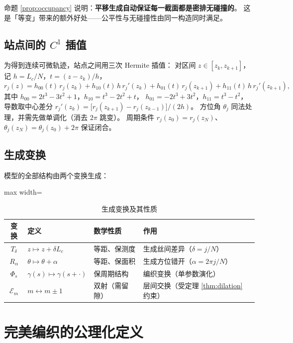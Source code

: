 \documentclass[12pt, a4paper]{ctexart}
\begin{document}
命题 \ref{prop:occupancy} 说明：\textbf{平移生成自动保证每一截面都是密排无碰撞的}。
这是「等变」带来的额外好处——公平性与无碰撞性由同一构造同时满足。

\subsection{站点间的 $C^1$ 插值}
\label{sec:interp}

为得到连续可微轨迹，站点之间用三次 Hermite 插值：
对区间 $z\in[z_k,z_{k+1}]$，记 $h=L_c/N$，$t=(z-z_k)/h$，
\begin{equation}
r_j(z) = h_{00}(t)\,r_j(z_k) + h_{10}(t)\,h\,r_j'(z_k)
       + h_{01}(t)\,r_j(z_{k+1}) + h_{11}(t)\,h\,r_j'(z_{k+1}),
\end{equation}
其中 $h_{00}=2t^3-3t^2+1$，$h_{10}=t^3-2t^2+t$，
$h_{01}=-2t^3+3t^2$，$h_{11}=t^3-t^2$，
导数取中心差分 $r_j'(z_k)=\big[r_j(z_{k+1})-r_j(z_{k-1})\big]/(2h)$。
方位角 $\theta_j$ 同法处理，并需先做单调化（消去 $2\pi$ 跳变）。
周期条件 $r_j(z_0)=r_j(z_N)$、$\theta_j(z_N)=\theta_j(z_0)+2\pi$ 保证闭合。

\subsection{生成变换}

模型的全部结构由两个变换生成：

\begin{table}[htbp]
\centering
\caption{生成变换及其性质}
\label{tab:transforms}
\begin{adjustbox}{max width=\textwidth}
\begin{tabular}{clll}
\toprule
变换 & 定义 & 数学性质 & 作用 \\
\midrule
$T_\delta$ & $z \mapsto z + \delta L_c$ & 等距、保测度 & 生成丝间差异（$\delta=j/N$）\\
$R_\alpha$ & $\theta \mapsto \theta + \alpha$ & 等距、保面积 & 生成方位错开（$\alpha=2\pi j/N$）\\
$\Phi_s$ & $\gamma(s) \mapsto \gamma(s+\cdot)$ & 保周期结构 & 编织变换（单参数演化）\\
$\mathcal{E}_m$ & $m \leftrightarrow m\pm1$ & 双射（需留隙） & 层间交换（受定理 \ref{thm:dilation} 约束）\\
\bottomrule
\end{tabular}
\end{adjustbox}
\end{table}

\section{完美编织的公理化定义}
\end{document}
